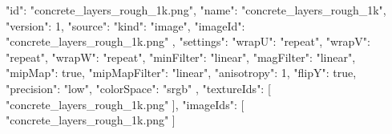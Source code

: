 {
  "id": "concrete_layers_rough_1k.png",
  "name": "concrete_layers_rough_1k",
  "version": 1,
  "source": {
    "kind": "image",
    "imageId": "concrete_layers_rough_1k.png"
  },
  "settings": {
    "wrapU": "repeat",
    "wrapV": "repeat",
    "wrapW": "repeat",
    "minFilter": "linear",
    "magFilter": "linear",
    "mipMap": true,
    "mipMapFilter": "linear",
    "anisotropy": 1,
    "flipY": true,
    "precision": "low",
    "colorSpace": "srgb"
  },
  "textureIds": [
    "concrete_layers_rough_1k.png"
  ],
  "imageIds": [
    "concrete_layers_rough_1k.png"
  ]
}

